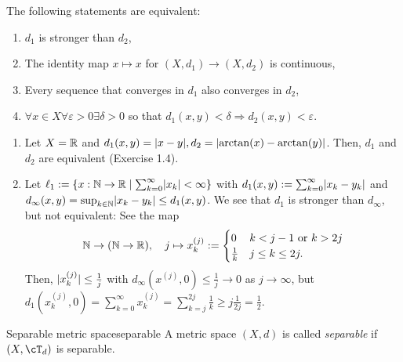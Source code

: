 \documentclass[language=english]{../../Template/TemplateLecture}
\begin{document}
\begin{prop}
    The following statements are equivalent:
    \begin{enumerate}[$(i)$]
        \item $d_1$ is stronger than $d_2$,
        \item The identity map $x \mapsto x$ for $(X,d_1) \to (X,d_2)$ is continuous,
        \item Every sequence that converges in $d_1$ also converges in $d_2$,
        \item $\forall x \in X \forall \varepsilon > 0 \exists \delta > 0$ so that $d_1(x,y) < \delta \Rightarrow d_2(x,y) < \varepsilon$.
    \end{enumerate}
\end{prop}

\begin{beispiel}\leavevmode
    \begin{enumerate}[$(i)$]
        \item Let $X = \mathbb{R}$ and $d_1(x,y) = \lvert x - y\rvert, d_2 = \lvert\arctan(x) - \arctan(y)\rvert$. Then, $d_1$ and $d_2$ are equivalent (Exercise 1.4).
        \item Let $\ell_1 := \{x: \mathbb{N} \to \mathbb{R} \mid \sum_{k = 0}^\infty \lvert x_k\rvert < \infty\}$ with $d_1(x,y) := \sum_{k = 0}^\infty \lvert x_k - y_k\rvert$ and $d_\infty(x,y) = \sup_{k \in \mathbb{N}} \lvert x_k - y_k\rvert \leq d_1(x,y)$. We see that $d_1$ is stronger than $d_\infty$, but not equivalent: See the map 
        \begin{equation}
            \mathbb{N} \to (\mathbb{N} \to \mathbb{R}), \quad j \mapsto x^{(j)}_k := \begin{cases}
                0 & k < j-1 \text{ or } k > 2j \\
                \frac{1}{k} & j \leq k \leq 2j.
            \end{cases}
        \end{equation} 
        Then, $\lvert x_k^{(j)}\rvert \leq \frac{1}{j}$ with $d_\infty(x^{(j)},0) \leq \frac{1}{j} \to 0$ as $j \to \infty$, but $d_1(x_k^{(j)},0) = \sum_{k = 0}^\infty x_k^{(j)} = \sum_{k = j}^{2j} \frac{1}{k} \geq j\frac{1}{2j} = \frac{1}{2}$.
    \end{enumerate}
\end{beispiel}

\begin{defi}{Separable metric space}{separable}
    A metric space $(X,d)$ is called \emph{separable} if $(X, \cT_d)$ is separable.
\end{defi}
\end{document}
